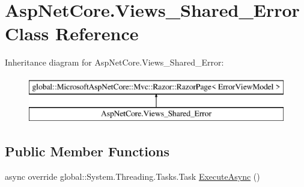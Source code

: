 \hypertarget{class_asp_net_core_1_1_views___shared___error}{}\section{Asp\+Net\+Core.\+Views\+\_\+\+Shared\+\_\+\+Error Class Reference}
\label{class_asp_net_core_1_1_views___shared___error}
Inheritance diagram for Asp\+Net\+Core.\+Views\+\_\+\+Shared\+\_\+\+Error\+:\begin{figure}[H]
\begin{center}
\leavevmode
\includegraphics[height=2.000000cm]{class_asp_net_core_1_1_views___shared___error}
\end{center}
\end{figure}
\subsection*{Public Member Functions}
\begin{DoxyCompactItemize}
\item 
async override global\+::\+System.\+Threading.\+Tasks.\+Task \mbox{\hyperlink{class_asp_net_core_1_1_views___shared___error_a3cdb89b5008b1f7058bd2493983c0356}{Execute\+Async}} ()
\end{DoxyCompactItemize}
